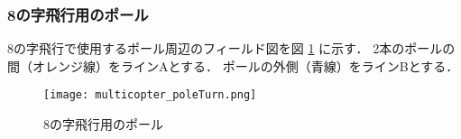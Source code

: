 \newpage
\subsubsection{8の字飛行用のポール}
8の字飛行で使用するポール周辺のフィールド図を図 \ref{fig::multicopter::poleTurn} に示す．
2本のポールの間（オレンジ線）をラインAとする．
ポールの外側（青線）をラインBとする．
\begin{figure}[h]
  \centering\texttt{[image: multicopter\_poleTurn.png]}
  \caption{8の字飛行用のポール}
  \label{fig::multicopter::poleTurn}
\end{figure}